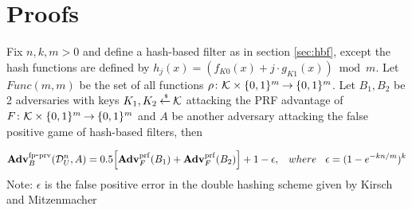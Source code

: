 \section{Proofs}
\begin{theorem}\label{thm}
Fix $n,k, m > 0$ and define a hash-based filter as in section \ref{sec:hbf}, except the hash functions are defined by $h_j(x) = \left( f_{K0}(x) + j\cdot g_{K1}(x)\right) \bmod m$. Let $Func(m,m)$ be the set of all functions $\rho \colon {\cal K} \times \{0,1\}^m {\:\stackrel{{\scriptscriptstyle \hspace{0.2em}}} {\rightarrow}\:} \{0,1\}^m$. Let $B_1, B_2$ be 2 adversaries with keys $K_1, K_2 {\:\stackrel{{\scriptscriptstyle \hspace{0.2em}\$}} {\leftarrow}\:} {\cal K}$ attacking the PRF advantage of $F \colon {\cal K} \times \{0,1\}^m {\:\stackrel{{\scriptscriptstyle \hspace{0.2em}}} {\rightarrow}\:} \{0,1\}^m$ and $A$ be another adversary attacking the false positive game of hash-based filters, then 

\begin{equation}
\mathrm{\mathbf{Adv}}^{\mathrm{fp\mbox{-}prv}}_{B}(\mathcal{D}_{U}^{n},A)  = 0.5\Big[\mathbf{Adv}^{\mathrm{prf}}_{F}(B_1) + \mathbf{Adv}^{\mathrm{prf}}_{F}(B_2)\Big] + 1-\epsilon, \hspace*{2ex} where \hspace*{2ex} \epsilon = (1-e^{-kn/m})^k
\end{equation}
Note: $\epsilon$ is the false positive error in the double hashing scheme given by Kirsch and Mitzenmacher \cite{xxx}
\end{theorem}

